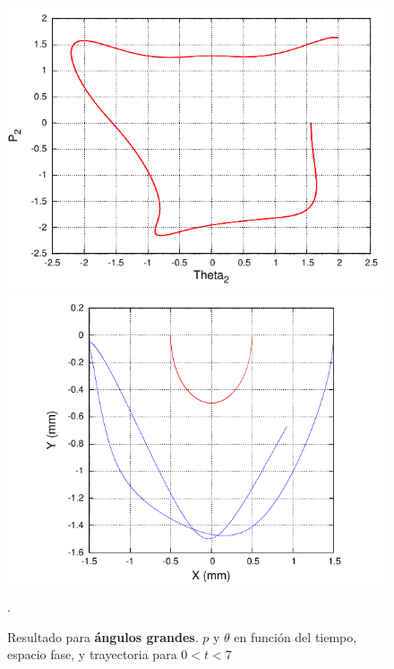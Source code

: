 \documentclass[10pt,letterpaper]{article}
\begin{document}
\begin{figure}
\includegraphics[scale=0.9]{BGrafica_EspacioFase.pdf}
\includegraphics[scale=0.9]{BGrafica_Trayectoria.pdf}
\caption{Resultado para \textbf{ángulos grandes}. $p$ y $\theta$ en función del tiempo, espacio fase, y trayectoria para $0<t<7$}\label{Fig-AngulosGrandes}.
\end{figure}
\end{document}
